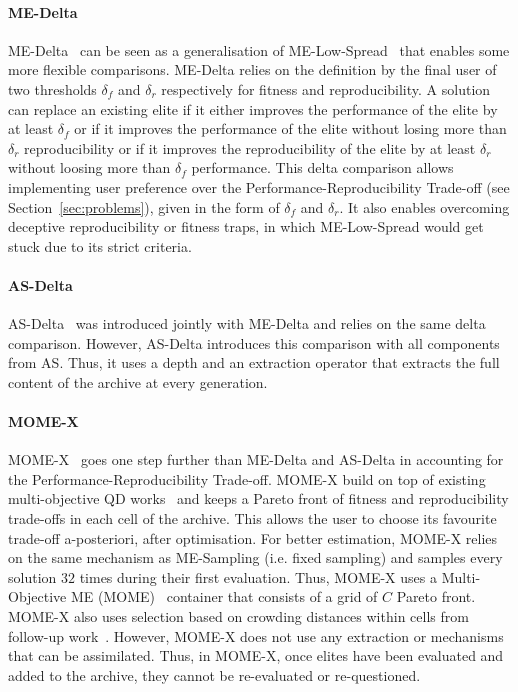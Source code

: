 \paragraph{ME-Delta}
ME-Delta~\cite{flageat2024exploring} can be seen as a generalisation of ME-Low-Spread~\cite{mace2023quality} that enables some more flexible comparisons. ME-Delta relies on the definition by the final user of two thresholds $\delta_f$ and $\delta_r$ respectively for fitness and reproducibility. A solution can replace an existing elite if it either improves the performance of the elite by at least $\delta_f$ or if it improves the performance of the elite without losing more than $\delta_r$ reproducibility or if it improves the reproducibility of the elite by at least $\delta_r$ without loosing more than $\delta_f$ performance. 
This delta comparison allows implementing user preference over the Performance-Reproducibility Trade-off (see Section~\ref{sec:problems}), given in the form of $\delta_f$ and $\delta_r$. It also enables overcoming deceptive reproducibility or fitness traps, in which ME-Low-Spread would get stuck due to its strict criteria. 

\paragraph{AS-Delta}
AS-Delta~\cite{flageat2024exploring} was introduced jointly with ME-Delta and relies on the same delta comparison. However, AS-Delta introduces this comparison with all components from AS. Thus, it uses a depth and an extraction operator that extracts the full content of the archive at every generation. 


\paragraph{MOME-X}
MOME-X~\cite{flageat2024exploring} goes one step further than ME-Delta and AS-Delta in accounting for the Performance-Reproducibility Trade-off. MOME-X build on top of existing multi-objective QD works~\cite{pierrot2022multi, janmohamed2023improving} and keeps a Pareto front of fitness and reproducibility trade-offs in each cell of the archive. This allows the user to choose its favourite trade-off a-posteriori, after optimisation. For better estimation, MOME-X relies on the same mechanism as ME-Sampling (i.e. fixed sampling) and samples every solution $32$ times during their first evaluation. 
Thus, MOME-X uses a Multi-Objective ME (MOME)~\cite{pierrot2022multi} container that consists of a grid of $C$ Pareto front. MOME-X also uses selection based on crowding distances within cells from follow-up work~\cite{janmohamed2023improving}. However, MOME-X does not use any extraction or mechanisms that can be assimilated. Thus, in MOME-X, once elites have been evaluated and added to the archive, they cannot be re-evaluated or re-questioned.

